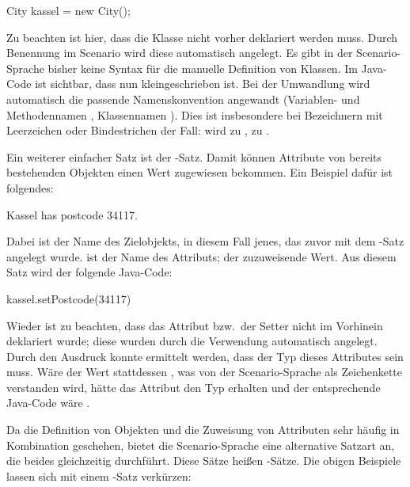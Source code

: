 \begin{jcodeblock}
    City kassel = new City();
\end{jcodeblock}

Zu beachten ist hier, dass die Klasse  nicht vorher deklariert werden muss.
Durch Benennung im Scenario wird diese automatisch angelegt.
Es gibt in der Scenario-Sprache bisher keine Syntax für die manuelle Definition von Klassen.
Im Java-Code ist sichtbar, dass  nun kleingeschrieben ist.
Bei der Umwandlung wird automatisch die passende Namenskonvention angewandt (Variablen- und Methodennamen , Klassennamen ).
Dies ist insbesondere bei Bezeichnern mit Leerzeichen oder Bindestrichen der Fall:
 wird zu ,  zu .

Ein weiterer einfacher Satz ist der -Satz.
Damit können Attribute von bereits bestehenden Objekten einen Wert zugewiesen bekommen.
Ein Beispiel dafür ist folgendes:

\begin{codeblock}
    Kassel has postcode 34117.
\end{codeblock}

Dabei ist  der Name des Zielobjekts, in diesem Fall jenes, das zuvor mit dem -Satz angelegt wurde.
 ist der Name des Attributs;  der zuzuweisende Wert.
Aus diesem Satz wird der folgende Java-Code:

\begin{jcodeblock}
    kassel.setPostcode(34117)
\end{jcodeblock}

Wieder ist zu beachten, dass das Attribut  bzw.\ der Setter  nicht im Vorhinein deklariert wurde;
diese wurden durch die Verwendung automatisch angelegt.
Durch den Ausdruck  konnte ermittelt werden, dass der Typ dieses Attributes  sein muss.
Wäre der Wert stattdessen , was von der Scenario-Sprache als Zeichenkette verstanden wird, hätte das Attribut den Typ  erhalten und der entsprechende Java-Code wäre .

Da die Definition von Objekten und die Zuweisung von Attributen sehr häufig in Kombination geschehen, bietet die Scenario-Sprache eine alternative Satzart an, die beides gleichzeitig durchführt.
Diese Sätze heißen -Sätze.
Die obigen Beispiele lassen sich mit einem -Satz verkürzen:

